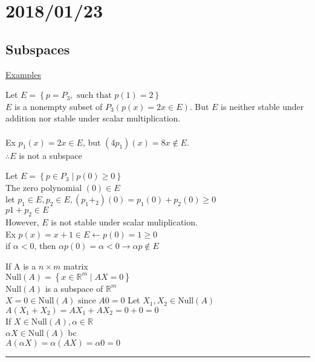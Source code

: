 \documentclass[12pt]{article}
\newcommand{\real}[0]{\mathbb{R}}
\newenvironment{proof}{\block[Proof]}{\endblock}
\newenvironment{examples}{\shownto{-,notes}\underline{Examples}\par\enumerate}{\endenumerate\divider\endshownto}
\newcommand{\bb}[1]{\left\{#1\right\}}
\newcommand{\divider}[0]{\textcolor{lightgray}{\rule{\textwidth}{0.1pt}}}
\begin{document}
\section{2018/01/23}

\subsection{Subspaces}

\begin{examples}
	\item Let $E = \bb{p = P_3, \text{ such that } p(1) = 2}$ \\
	$E$ is a nonempty subset of $P_3 (p(x) = 2x \in E)$. But $E$ is neither stable under addition nor stable under scalar multiplication. \\\\
	Ex $p_1(x) = 2x \in E$, but $(4p_1)(x) = 8x \notin E$. \\
	$\therefore E$ is not a subspace 
	
	\item Let $E = \bb{p \in P_3 \mid p(0) \ge 0}$ \\
	The zero polynomial $(0) \in E$ \\
	let $p_1 \in E, p_2 \in E, (p_1 + _2)(0) = p_1(0) + p_2(0) \ge 0$ \\
	$p1 + p_2 \in E$ \\
	However, $E$ is not stable under scalar muliplication. \\
	Ex $p(x) = x + 1 \in E \leftarrow p(0) = 1 \ge 0$ \\
	if $\alpha < 0$, then $\alpha p(0) = \alpha < 0 \rightarrow \alpha p \notin E$
	
	\item If A is a $n \times m$ matrix \\
	$\text{Null}(A) = \bb{x \in \real^m \mid AX = 0}$ \\
	$\text{Null}(A)$ is a subspace of $\real^m$ \\
	\begin{proof}
		$X = 0 \in \text{Null}(A) \text{ since } A0 = 0$
		Let $X_1, X_2 \in \text{Null}(A)$ \\
		$A(X_1 + X_2) = AX_1 + AX_2 = 0 + 0 = 0$ \\
		If $X \in \text{Null}(A), \alpha \in \real$ \\
		$\alpha X \in \text{Null}(A)$ bc \\
		$A(\alpha X) = \alpha (AX) = \alpha 0 = 0$
	\end{proof}
\end{examples}
\end{document}
